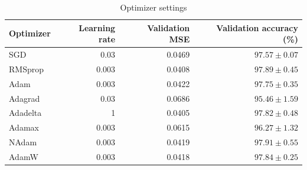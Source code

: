 \begin{table}[htbp]
\centering
\caption{Optimizer settings}
\label{tab:optimizers}
\small
\begin{tabular}{lrrr}
\toprule
Optimizer & Learning rate & Validation MSE & Validation accuracy (\%) \\
\midrule
SGD & 0.03 & 0.0469 & $97.57\pm 0.07$ \\
RMSprop & 0.003 & 0.0408 & $97.89\pm 0.45$ \\
Adam & 0.003 & 0.0422 & $97.75\pm 0.35$ \\
Adagrad & 0.03 & 0.0686 & $95.46\pm 1.59$ \\
Adadelta & 1 & 0.0405 & $97.82\pm 0.48$ \\
Adamax & 0.003 & 0.0615 & $96.27\pm 1.32$ \\
NAdam & 0.003 & 0.0419 & $97.91\pm 0.55$ \\
AdamW & 0.003 & 0.0418 & $97.84\pm 0.25$ \\
\bottomrule
\end{tabular}
\end{table}
